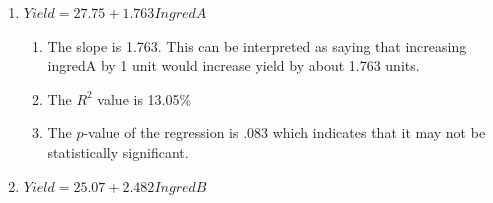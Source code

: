 \documentclass{article}
\providecommand{\tightlist}{%
      \setlength{\itemsep}{0pt}\setlength{\parskip}{0pt}}
\begin{document}
\begin{enumerate}
  \begin{figure}[!h]
   \begin{floatrow}
  \end{floatrow}

  \end{figure}

  \newpage
\item
  \(Yield = 27.75 + 1.763 IngredA\)

  \begin{enumerate}
  \def\labelenumii{\roman{enumii})}
  \tightlist
  \item
    The slope is 1.763. This can be interpreted as saying that
    increasing ingredA by 1 unit would increase yield by about 1.763
    units.
  \item
    The \(R^2\) value is 13.05\%
  \item
    The \(p\)-value of the regression is .083 which indicates that it
    may not be statistically significant.
  \end{enumerate}
\item
  \(Yield = 25.07 + 2.482 IngredB\)


\end{enumerate}
\end{document}
